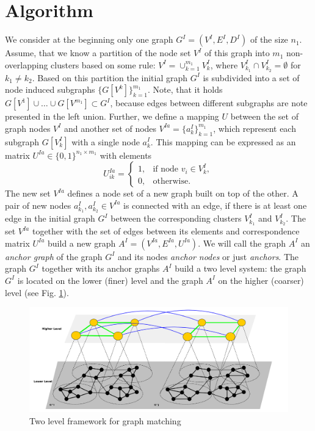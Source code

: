 \section{Algorithm}
We consider at the beginning only one graph $G^I=(V^I,E^I,D^I)$ of the size $n_1$. Assume, that we know a partition of the node set $V^I$ of this graph into $m_1$ non-overlapping clusters based on some rule: $V^I=\cup_{k=1}^{m_1}V^I_k$, where $V^I_{k_1}\cap V^I_{k_2}=\emptyset$ for $k_1\not=k_2$. Based on this partition the initial graph $G^I$ is subdivided into a set of node induced subgraphs $\{G[V^k]\}_{k=1}^{m_1}$. Note, that it holds $G[V^1]\cup\dots\cup G[V^{m_1}]\subset G^I$, because edges between different subgraphs are note presented in the left union.
Further, we define a mapping $U$ between the set of graph nodes $V^I$ and another set of nodes $V^{Ia}=\{a^I_k\}_{k=1}^{m_1}$, which represent each subgraph  $G[V^I_k]$ with a single node $a^I_k$. This mapping can be expressed as an matrix $U^{Ia}\in\{0,1\}^{n_1\times m_1}$ with elements 
\begin{equation*}
U^{Ia}_{ik} = \begin{cases} 1, & \mbox{if node } v_i\in V^I_k,    \\
0, & \mbox{otherwise}.\end{cases}
\end{equation*}
The new set $V^{Ia}$ defines a node set of a new graph built on top of the other. A pair of new nodes $a^I_{k_1},a^I_{k_2}\in V^{Ia}$ is connected with an edge, if there is at least one edge in the initial graph $G^I$ between the corresponding clusters $V^I_{k_1}$ and $V^I_{k_2}$. The set $V^{Ia}$ together with the set of edges between its elements and correspondence matrix $U^{Ia}$ build a new graph $A^I=(V^{Ia},E^{Ia},U^{Ia})$. We will call the graph $A^I$ an \emph{anchor graph} of the graph $G^I$ and its nodes \emph{anchor nodes} or just \emph{anchors}. The graph $G^I$ together with its anchor graphs $A^I$ build a two level system: the graph $G^I$ is located on the lower (finer) level and the graph $A^I$ on the higher (coarser) level (see Fig. \ref{fig:2levels}).

\begin{figure} [h!]
	\centering
	\includegraphics[scale=0.35]{chapter2/fig/twolevels2.pdf}
	\caption{Two level framework for graph matching} \label{fig:2levels}
\end{figure}

